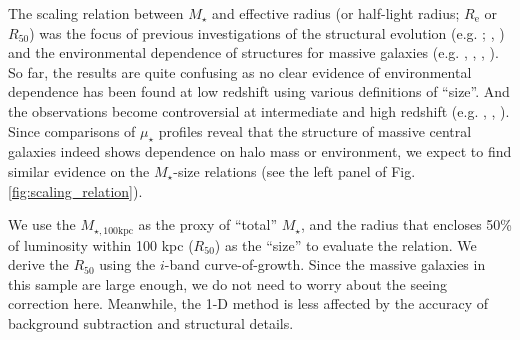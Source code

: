 \documentclass{emulateapj}
\def\mstar{{$M_{\star}$}}
\def\mtot{{$M_{\star,100\mathrm{kpc}}$}}
\def\mden{{$\mu_{\star}$}}
\newcommand{\update}[1]{\textcolor{Bittersweet}{#1}}
\begin{document}
\begin{CJK*}{UTF8}{gbsn}
    The scaling relation between \mstar{} and effective radius (or half-light radius;
    $R_{\mathrm{e}}$ or $R_{\mathrm{50}}$) 
    was the focus of previous investigations of the structural evolution 
    (e.g. \citealt{Shankar2013}; \citealt{Leja2013}, \citealt{vdWel2014}) and 
    the environmental dependence of structures for massive galaxies 
    (e.g. \citealt{Weinmann2009}, \citealt{Nair2010}, \citealt{HCompany13}, 
    \citealt{Cerbrian2014}). 
    So far, the results are quite confusing as no clear evidence of environmental 
    dependence has been found at low redshift using various definitions of ``size''. 
    And the observations become controversial at intermediate and high redshift
    (e.g. \citealt{MCooper2012}, \citealt{Papovich2012}, \citealt{Kelkar2015}).
    \update{
    Since comparisons of \mden{} profiles reveal that the structure of massive central 
    galaxies indeed shows dependence on halo mass or environment, we expect to find 
    similar evidence on the \mstar{}-size relations (see the left panel of 
    Fig.\ref{fig:scaling_relation}).
    }
     
    We use the \mtot{} as the proxy of ``total'' \mstar{}, and the 
    radius that encloses 50\% of luminosity within 100 kpc ($R_{\mathrm{50}}$) as 
    the ``size'' to evaluate the relation.
    \update{
    We derive the $R_{\mathrm{50}}$ using the $i$-band curve-of-growth. 
    Since the massive galaxies in this sample are large enough, we do not need to 
    worry about the seeing correction here. 
    Meanwhile, the 1-D method is less affected by the accuracy of background 
    subtraction and structural details.
    }
    
    

\end{CJK*}
\end{document}
